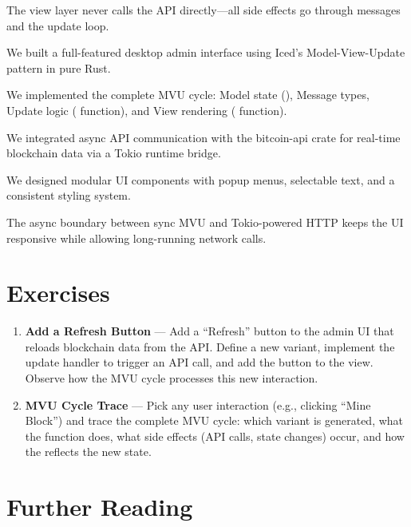 The view layer never calls the API directly---all side effects go through messages and the update loop.

\begin{chaptersummary}
\item We built a full-featured desktop admin interface using Iced's Model-View-Update pattern in pure Rust.
\item We implemented the complete MVU cycle: Model state (), Message types, Update logic ( function), and View rendering ( function).
\item We integrated async API communication with the bitcoin-api crate for real-time blockchain data via a Tokio runtime bridge.
\item We designed modular UI components with popup menus, selectable text, and a consistent styling system.
\item The async boundary between sync MVU and Tokio-powered HTTP keeps the UI responsive while allowing long-running network calls.
\end{chaptersummary}

\section{Exercises}
\label{sec:ch16-exercises}

\begin{enumerate}
  \item \textbf{Add a Refresh Button} --- Add a ``Refresh'' button to the admin UI that reloads blockchain data from the API. Define a new  variant, implement the update handler to trigger an API call, and add the button to the view. Observe how the MVU cycle processes this new interaction.

  \item \textbf{MVU Cycle Trace} --- Pick any user interaction (e.g., clicking ``Mine Block'') and trace the complete MVU cycle: which  variant is generated, what the  function does, what side effects (API calls, state changes) occur, and how the  reflects the new state.
\end{enumerate}

\section{Further Reading}
\label{sec:ch16-reading}

